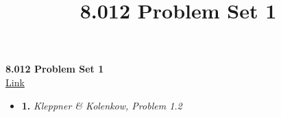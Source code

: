 \documentclass[12pt,twoside]{article}
\title{8.012 Problem Set 1}
\begin{document}
\centering
\textbf{8.012 Problem Set 1} \\
\href{https://ocw.mit.edu/courses/physics/8-012-physics-i-classical-mechanics-fall-2008/assignments/ps1.pdf}{Link}
\centering

\setlength{\parindent}{0pt}

\medskip

\hrulefill








\begin{itemize}
\item \textbf{1.} \emph{Kleppner \& Kolenkow, Problem 1.2} \\ \vspace{5mm}

  


\end{itemize}
\end{document}
